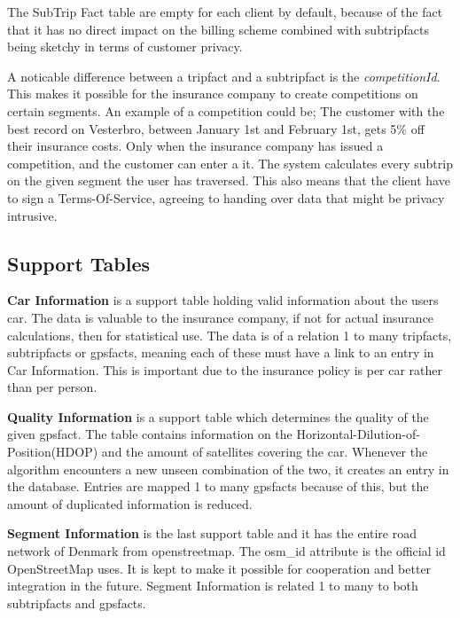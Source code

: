 The SubTrip Fact table are empty for each client by default, because of the fact that it has no direct impact on the billing scheme combined with subtripfacts being sketchy in terms of customer privacy. 

A noticable difference between a tripfact and a subtripfact is the \textit{competitionId}. This makes it possible for the insurance company to create competitions on certain segments. An example of a competition could be; The customer with the best record on Vesterbro, between January 1st and February 1st, gets 5\% off their insurance costs. Only when the insurance company has issued a competition, and the customer can enter a it. The system calculates every subtrip on the given segment the user has traversed. This also means that the client have to sign a Terms-Of-Service, agreeing to handing over data that might be privacy intrusive. 


\subsection{Support Tables}

\textbf{Car Information} is a support table holding valid information about the users car. The data is valuable to the insurance company, if not for actual insurance calculations, then for statistical use. The data is of a relation 1 to many tripfacts, subtripfacts or gpsfacts, meaning each of these must have a link to an entry in Car Information. This is important due to the insurance policy is per car rather than per person.

\textbf{Quality Information} is a support table which determines the quality of the given gpsfact. The table contains information on the Horizontal-Dilution-of-Position(HDOP) and the amount of satellites covering the car. Whenever the algorithm encounters a new unseen combination of the two, it creates an entry in the database. Entries are mapped 1 to many gpsfacts because of this, but  the amount of duplicated information is reduced.

\textbf{Segment Information} is the last support table and it has the entire road network of Denmark from openstreetmap. The osm\_id  attribute is the official id OpenStreetMap uses. It is kept to make it possible for cooperation and better integration in the future. Segment Information is related 1 to many to both subtripfacts and gpsfacts.
